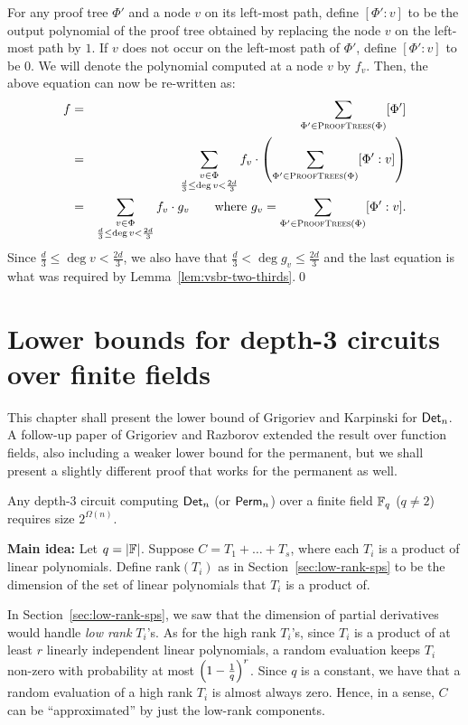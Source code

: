 \documentclass[12pt]{report}
\begin{document}
For any proof tree $\Phi'$ and a node $v$ on its left-most path,
define $[\Phi':v]$ to be the output polynomial of the proof tree 
obtained by replacing the node $v$ on the left-most path by $1$. 
If $v$ does not occur on the
left-most path of $\Phi'$, define $[\Phi':v]$ to be $0$. We will 
denote the polynomial computed at a node $v$ by $f_{v}$. Then, the
above equation can now be re-written as:
\begin{eqnarray*}
f & = & \sum_{\Phi' \in \textsc{ProofTrees}(\Phi)} [\Phi']\\
  & = & \sum_{\substack{v\in \Phi\\ \frac{d}{3}\leq \deg{v} < \frac{2d}{3}}} f_{v} \cdot \left( \sum_{\Phi'\in \textsc{ProofTrees}(\Phi)} [\Phi':v]\right)\\
  & = & \sum_{\substack{v\in \Phi\\ \frac{d}{3}\leq \deg{v} < \frac{2d}{3}}} f_{v} \cdot g_v\quad\quad\text{where $g_v = \sum_{\Phi'\in \textsc{ProofTrees}(\Phi)} [\Phi':v]$} .\\
\end{eqnarray*}
Since $\frac{d}{3} \leq \deg{v} < \frac{2d}{3}$, we also have that
$\frac{d}{3} < \deg{g_v} \leq \frac{2d}{3}$ and the last equation is
what was required by Lemma~\ref{lem:vsbr-two-thirds}.\qed

\chapter{Lower bounds for depth-3 circuits over finite fields}

This chapter shall present the lower bound of Grigoriev and Karpinski
\cite{grigoriev98} for $\mathsf{Det}_n$. A follow-up paper of Grigoriev and
Razborov \cite{gr00} extended the result over function fields, also
including a weaker lower bound for the permanent, but we shall present a slightly different proof that works for the permanent as well. 

\begin{theorem}\cite{grigoriev98}\label{thm:gk-main-thm}
  Any depth-3 circuit computing $\mathsf{Det}_n$ (or $\mathsf{Perm}_n$) over a finite field $\mathbb{F}_q$ ($q\neq 2$)
  requires size $2^{\Omega(n)}$.
\end{theorem}

{\bf Main idea:} Let $q = |\mathbb{F}|$. Suppose $C = T_1 + \dots + T_s$,
where each $T_i$ is a product of linear polynomials. Define
$\mathrm{rank}(T_i)$ as in Section~\ref{sec:low-rank-sps} to be the
dimension of the set of linear polynomials that $T_i$ is a product
of. 

In Section~\ref{sec:low-rank-sps}, we saw that the dimension of partial
derivatives would handle \emph{low rank} $T_i$'s. As for the high rank $T_i$'s, since $T_i$ is a product of at least $r$ linearly independent linear polynomials, a random evaluation keeps $T_i$ non-zero with probability at most $\left(1-\frac{1}{q}\right)^r$. Since $q$ is a constant, we have that a random evaluation of a high rank $T_i$ is almost always zero. Hence, in a sense, $C$ can be
``approximated'' by just the low-rank components. 
\end{document}
